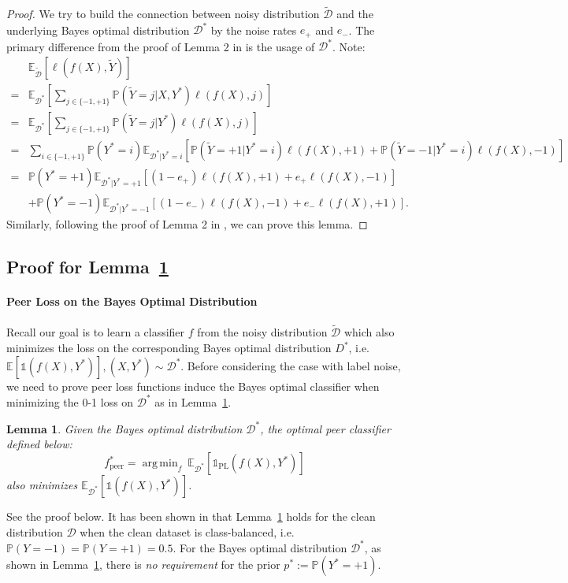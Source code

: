 \documentclass[final]{cvpr}
\DeclareMathOperator*{\argmin}{arg\,min}
\newcommand{\PP}{\mathbb P}
\newcommand{\BR}{\mathds 1}
\newcommand{\E}{\mathbb E}
\newtheorem{lemma}{Lemma}
\begin{document}
\begin{proof}

We try to build the connection between noisy distribution $\widetilde{\mathcal{D}}$ and the underlying Bayes optimal distribution $\mathcal D^*$ by the noise rates $e_+$ and $e_-$. 
The primary difference from the proof of Lemma 2 in \cite{liu2019peer} is the usage of $\mathcal D^*$.
Note:
\begin{align*}
  & \mathbb{E}_\mathcal{\widetilde{D}}[\ell(f(X), \widetilde{Y})] \\
= & \mathbb{E}_\mathcal{{D^*}}\left[ \sum_{j \in \{-1,+1\}} \PP(\widetilde Y = j|X,Y^*) \ell(f(X),j) \right] \\ 
= & \mathbb{E}_\mathcal{{D^*}}\left[ \sum_{j \in \{-1,+1\}} \PP(\widetilde Y = j|Y^*) \ell(f(X),j) \right] \\ 
= &  \sum_{i\in \{-1,+1\}} \PP(Y^*=i) \mathbb{E}_{\mathcal{D^*}|Y^*=i}[  \PP(\widetilde Y = +1|Y^*=i) \ell(f(X),+1)  + \PP(\widetilde Y = -1|Y^*=i) \ell(f(X),-1)]\\
= & \PP(Y^*=+1) \mathbb{E}_{\mathcal{D^*}|Y^*=+1}[  (1-e_{+}) \ell(f(X),+1)  + e_+ \ell(f(X),-1)]\\
 & + \PP(Y^*=-1) \mathbb{E}_{\mathcal{D^*}|Y^*=-1}[  (1-e_{-}) \ell(f(X),-1)  + e_- \ell(f(X),+1)].
\end{align*}
Similarly, following the proof of Lemma 2 in \cite{liu2019peer}, we can prove this lemma.
\end{proof}

\subsection{Proof for Lemma~\ref{lem:peerBayes}}\label{proof:peerBayes}

\paragraph{Peer Loss on the Bayes Optimal Distribution}

Recall our goal is to learn a classifier $f$ from the noisy distribution $\widetilde{\mathcal D}$ which also minimizes the loss on the corresponding Bayes optimal distribution $D^*$, i.e.
$\E [\BR(f(X), Y^*)], (X,Y^*)\sim \mathcal D^*$. 
Before considering the case with label noise, we need to prove peer loss functions induce the Bayes optimal classifier when minimizing the 0-1 loss on $\mathcal D^*$ as in Lemma~\ref{lem:peerBayes}.


\begin{lemma}\label{lem:peerBayes}
Given the Bayes optimal distribution $\mathcal D^*$, the optimal peer classifier defined below:
\[
f^*_{\text{peer}} = \argmin_{f} ~\E_{\mathcal D^*}[{{\BR_{\text{PL}}}}(f(X),Y^*)]
\]
also minimizes $\E_{\mathcal D^*}[\BR(f(X),Y^*)]$.
\end{lemma}
See the proof below.
It has been shown in \cite{liu2019peer} that Lemma~\ref{lem:peerBayes} holds for the clean distribution $\mathcal D$ when the clean dataset is class-balanced, i.e. $\PP(Y=-1) = \PP(Y=+1) = 0.5$. For the Bayes optimal distribution $\mathcal D^*$, as shown in Lemma~\ref{lem:peerBayes}, there is \emph{no requirement} for the prior $p^*:=\PP(Y^*=+1)$.
\end{document}
